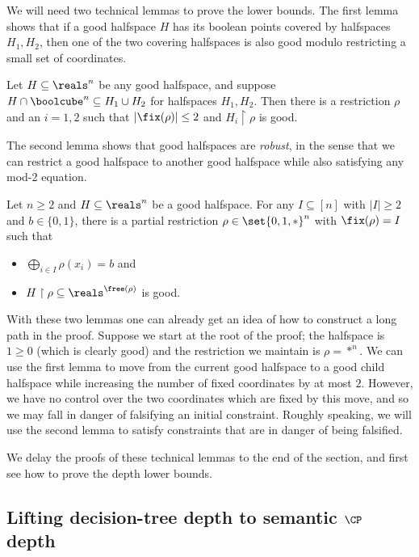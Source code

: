 \documentclass{toc}
\begin{document}
We will need two technical lemmas to prove the lower bounds.
The first lemma shows that if a good halfspace $H$ has its boolean points covered by halfspaces $H_1, H_2$, then one of the two covering halfspaces is also good modulo restricting a small set of coordinates.
\begin{lemma}\label{lem:crux}
	Let $H \subseteq \reals^n$ be any good halfspace, and suppose $H \cap \boolcube^n \subseteq H_1 \cup H_2$ for halfspaces $H_1, H_2$.
	Then there is a restriction $\rho$ and an $i = 1,2$ such that $|\fix(\rho)| \leq 2$ and $H_i \restriction \rho$ is good.
\end{lemma}

The second lemma shows that good halfspaces are \emph{robust}, in the sense that we can restrict a good halfspace to another good halfspace while also satisfying any mod-2 equation.
\begin{lemma}\label{lem:consistent-restriction}
	Let $n \geq 2$ and $H \subseteq \reals^n$ be a good halfspace.
	For any $I \subseteq [n]$ with $|I| \geq 2$ and $b \in \{0,1\}$, there is a partial restriction $\rho \in \set{0,1,*}^n$ with $\fix(\rho) = I$ such that 
\begin{itemize}
	\item $\displaystyle{\bigoplus_{i \in I} \rho(x_i) = b}$ and
	\item $H \restriction \rho \subseteq \reals^{\free(\rho)}$ is good.
\end{itemize}
\end{lemma}

With these two lemmas one can already get an idea of how to construct a long path in the proof.
Suppose we start at the root of the proof; the halfspace is $1 \geq 0$ (which is clearly good) and the restriction we maintain is $\rho = *^n$.
We can use the first lemma to move from the current good halfspace to a good child halfspace while increasing the number of fixed coordinates by at most $2$.
However, we have no control over the two coordinates which are fixed by this move, and so we may fall in danger of falsifying an initial constraint.
Roughly speaking, we will use the second lemma to satisfy constraints that are in danger of being falsified.

We delay the proofs of these technical lemmas to the end of the section, and first see how to prove the depth lower bounds.


%
\subsection{Lifting decision-tree depth to semantic    %
  \texorpdfstring{$\CP$}{CP} depth} 
\end{document}
